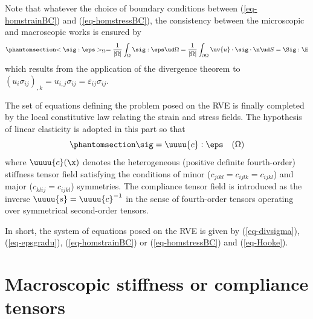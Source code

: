 \documentclass[
  letterpaper,
  DIV=11,
  numbers=noendperiod]{scrreprt}
\begin{document}
\begin{tcolorbox}[enhanced jigsaw, left=2mm, bottomrule=.15mm, colbacktitle=quarto-callout-note-color!10!white, colback=white, colframe=quarto-callout-note-color-frame, rightrule=.15mm, bottomtitle=1mm, toptitle=1mm, titlerule=0mm, title=\textcolor{quarto-callout-note-color}{\faInfo}\hspace{0.5em}{Hill lemma}, toprule=.15mm, arc=.35mm, opacityback=0, opacitybacktitle=0.6, leftrule=.75mm, breakable, coltitle=black]

Note that whatever the choice of boundary conditions between
(\ref{eq-homstrainBC}) and (\ref{eq-homstressBC}), the consistency
between the microscopic and macroscopic works is ensured by
\begin{equation}\phantomsection\label{eq-Hilllemma}{
<\sig:\eps>_{\Omega}
=\frac{1}{\lvert \Omega \rvert}\int_\Omega \sig:\eps\ud \Omega
=\frac{1}{\lvert \Omega \rvert}\int_{\partial\Omega} \uv{u}\cdot\sig\cdot\n \ud S
=\Sig:\E
}\end{equation} which results from the application of the divergence
theorem to
\((u_i\sigma_{ij})_{,k}=u_{i,j}\sigma_{ij}=\varepsilon_{ij}\sigma_{ij}\).

\end{tcolorbox}

The set of equations defining the problem posed on the RVE is finally
completed by the local constitutive law relating the strain and stress
fields. The hypothesis of linear elasticity is adopted in this part so
that \begin{equation}\phantomsection\label{eq-Hooke}{
\sig=\uuuu{c}:\eps \quad(\Omega)
}\end{equation} where \(\uuuu{c}(\x)\) denotes the heterogeneous
(positive definite fourth-order) stiffness tensor field satisfying the
conditions of minor (\(c_{jikl}=c_{ijlk}=c_{ijkl}\)) and major
(\(c_{klij}=c_{ijkl}\)) symmetries. The compliance tensor field is
introduced as the inverse \(\uuuu{s}=\uuuu{c}^{-1}\) in the sense of
fourth-order tensors operating over symmetrical second-order tensors.

In short, the system of equations posed on the RVE is given by
(\ref{eq-divsigma}), (\ref{eq-epsgradu}), (\ref{eq-homstrainBC}) or
(\ref{eq-homstressBC}) and (\ref{eq-Hooke}).

\section{Macroscopic stiffness or compliance
tensors}\label{sec-basics_elas_mac_stiff}
\end{document}
